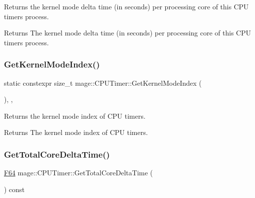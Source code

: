 Returns the kernel mode delta time (in seconds) per processing core of this C\+PU timer\textquotesingle{}s process.

\begin{DoxyReturn}{Returns}
The kernel mode delta time (in seconds) per processing core of this C\+PU timer\textquotesingle{}s process. 
\end{DoxyReturn}
\hypertarget{classmage_1_1_c_p_u_timer_ae13da8e25167ec92802d272901e2598c}{}\label{classmage_1_1_c_p_u_timer_ae13da8e25167ec92802d272901e2598c} 
\subsubsection{\texorpdfstring{Get\+Kernel\+Mode\+Index()}{GetKernelModeIndex()}}
{\footnotesize\ttfamily static constexpr size\+\_\+t mage\+::\+C\+P\+U\+Timer\+::\+Get\+Kernel\+Mode\+Index (\begin{DoxyParamCaption}{ }\end{DoxyParamCaption})\hspace{0.3cm}{\ttfamily [static]}, {\ttfamily [private]}, {\ttfamily [noexcept]}}

Returns the kernel mode index of C\+PU timers.

\begin{DoxyReturn}{Returns}
The kernel mode index of C\+PU timers. 
\end{DoxyReturn}
\hypertarget{classmage_1_1_c_p_u_timer_adb10ccea8664d1400d88953192a5a111}{}\label{classmage_1_1_c_p_u_timer_adb10ccea8664d1400d88953192a5a111} 
\subsubsection{\texorpdfstring{Get\+Total\+Core\+Delta\+Time()}{GetTotalCoreDeltaTime()}}
{\footnotesize\ttfamily \hyperlink{namespacemage_ad26233bbec640deda836e572c1a23708}{F64} mage\+::\+C\+P\+U\+Timer\+::\+Get\+Total\+Core\+Delta\+Time (\begin{DoxyParamCaption}{ }\end{DoxyParamCaption}) const\hspace{0.3cm}{\ttfamily [noexcept]}}

